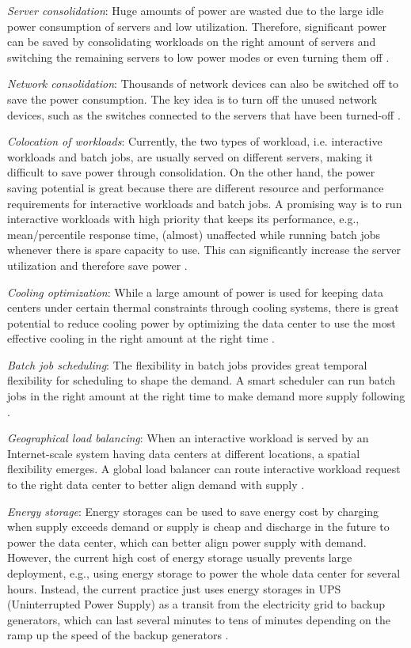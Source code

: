 \emph{Server consolidation}: Huge amounts of power are wasted due to the large idle power consumption of servers and low utilization. Therefore, significant power can be saved by consolidating workloads on the right amount of servers and switching the remaining servers to low power modes or even turning them off \cite{zhang2012dynamic,lin2011online,lin2013dynamic}.

\emph{Network consolidation}: Thousands of network devices can also be switched off to save the power consumption. The key idea is to turn off the unused network devices, such as the switches connected to the servers that have been turned-off \cite{andrews2012routing,zhang2010greente,sharmashrink}.
 
\emph{Colocation of workloads}: Currently, the two types of workload, i.e. interactive workloads and batch jobs, are usually served on different servers, making it difficult to save power through consolidation. On the other hand, the power saving potential is great because there are different resource and performance requirements for interactive workloads and batch jobs. A promising way is to run interactive workloads with high priority that keeps its performance, e.g., mean/percentile response time, (almost) unaffected while running batch jobs whenever there is spare capacity to use. This can significantly increase the server utilization and therefore save power \cite{aksanli2012utilizing}.

\emph{Cooling optimization}: While a large amount of power is used for keeping data centers under certain thermal constraints through cooling systems, there is great potential to reduce cooling power by optimizing the data center to use the most effective cooling in the right amount at the right time \cite{liu2012renewable,pakbaznia2009minimizing}.

\emph{Batch job scheduling}: The flexibility in batch jobs provides great temporal flexibility for scheduling to shape the demand. A smart scheduler can run batch jobs in the right amount at the right time to make demand more supply following \cite{mukherjee2009spatio,garg2011sla}.

\emph{Geographical load balancing}: When an interactive workload is served by an Internet-scale system having data centers at different locations, a spatial flexibility emerges. A global load balancer can route interactive workload request to the right data center to better align demand with supply \cite{qureshi2009cutting,liu2011greening}.

\emph{Energy storage}: Energy storages can be used to save energy cost by charging when supply exceeds demand or supply is cheap and discharge in the future to power the data center, which can better align power supply with demand. However, the current high cost of energy storage usually prevents large deployment, e.g., using energy storage to power the whole data center for several hours. Instead, the current practice just uses energy storages in UPS (Uninterrupted Power Supply) as a transit from the electricity grid to backup generators, which can last several minutes to tens of minutes depending on the ramp up the speed of the backup generators \cite{urgaonkar2011optimal,liu2012renewable,liu2013data}.

